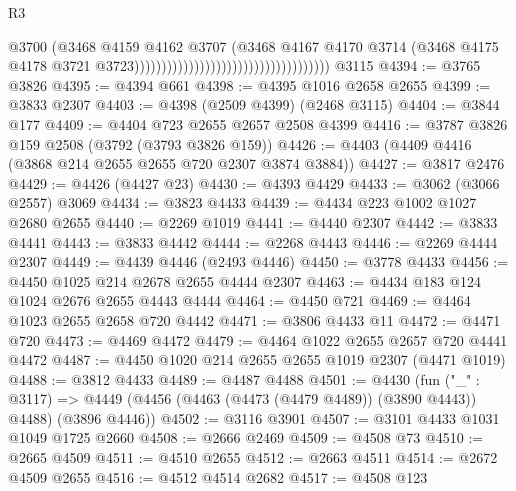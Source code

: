 \begin{lexlean}{R3}
\begin{coremodule}
                                                                      @3700
                                                                      (@3468
                                                                        @4159
                                                                        @4162
                                                                        @3707
                                                                        (@3468
                                                                          @4167
                                                                          @4170
                                                                          @3714
                                                                          (@3468
                                                                            @4175
                                                                            @4178
                                                                            @3721
                                                                            @3723))))))))))))))))))))))))))))))))))))
    @3115
@4394 := @3765 @3826
@4395 := @4394 @661
@4398 := @4395 @1016 @2658 @2655
@4399 := @3833 @2307
@4403 := @4398 (@2509 @4399) (@2468 @3115)
@4404 := @3844 @177
@4409 := @4404 @723 @2655 @2657 @2508 @4399
@4416 := @3787 @3826 @159 @2508 (@3792 (@3793 @3826 @159))
@4426 := @4403 (@4409 @4416 (@3868 @214 @2655 @2655 @720 @2307 @3874 @3884))
@4427 := @3817 @2476
@4429 := @4426 (@4427 @23)
@4430 := @4393 @4429
@4433 := @3062 (@3066 @2557) @3069
@4434 := @3823 @4433
@4439 := @4434 @223 @1002 @1027 @2680 @2655
@4440 := @2269 @1019
@4441 := @4440 @2307
@4442 := @3833 @4441
@4443 := @3833 @4442
@4444 := @2268 @4443
@4446 := @2269 @4444 @2307
@4449 := @4439 @4446 (@2493 @4446)
@4450 := @3778 @4433
@4456 := @4450 @1025 @214 @2678 @2655 @4444 @2307
@4463 := @4434 @183 @124 @1024 @2676 @2655 @4443 @4444
@4464 := @4450 @721
@4469 := @4464 @1023 @2655 @2658 @720 @4442
@4471 := @3806 @4433 @11
@4472 := @4471 @720
@4473 := @4469 @4472
@4479 := @4464 @1022 @2655 @2657 @720 @4441 @4472
@4487 := @4450 @1020 @214 @2655 @2655 @1019 @2307 (@4471 @1019)
@4488 := @3812 @4433
@4489 := @4487 @4488
@4501 := @4430
    (fun ("_" : @3117) =>
    @4449 (@4456 (@4463 (@4473 (@4479 @4489)) (@3890 @4443)) @4488) (@3896 @4446))
@4502 := @3116 @3901
@4507 := @3101 @4433 @1031 @1049 @1725 @2660
@4508 := @2666 @2469
@4509 := @4508 @73
@4510 := @2665 @4509
@4511 := @4510 @2655
@4512 := @2663 @4511
@4514 := @2672 @4509 @2655
@4516 := @4512 @4514 @2682
@4517 := @4508 @123

\end{coremodule}
\end{lexlean}
